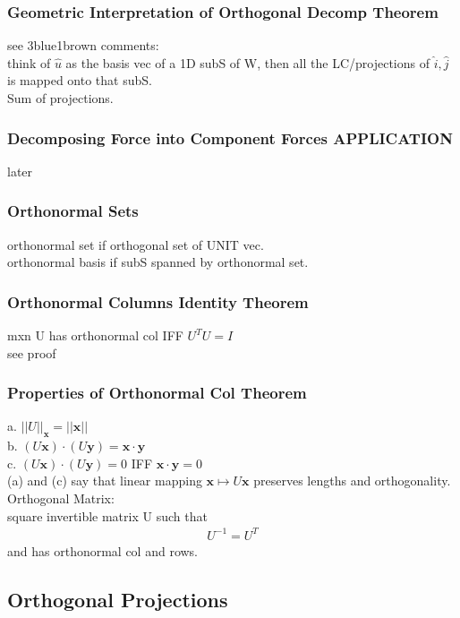 \documentclass[12pt]{article}
\begin{document}
    \subsubsection{Geometric Interpretation of Orthogonal Decomp Theorem}
        see 3blue1brown comments:\\
        think of $\hat{u}$ as the basis vec of a 1D subS of W, then
        all the LC/projections of $\hat{i}, \hat{j}$  is mapped onto
        that subS.\\
        Sum of projections.
    \subsubsection{Decomposing Force into Component Forces APPLICATION}
        later
    \subsubsection{Orthonormal Sets}
        orthonormal set if orthogonal set of UNIT vec. \\
        orthonormal basis if subS spanned by orthonormal set.
    \subsubsection{Orthonormal Columns Identity Theorem}
        mxn U has orthonormal col IFF $U^TU = I$ \\
        see proof
    \subsubsection{Properties of Orthonormal Col Theorem}
        a. $ ||U||_{\bm{x}} = ||\bm{x}|| $  \\
        b. $ (U\bm{x})\cdot (U\bm{y}) = \bm{x}\cdot \bm{y} $ \\
        c. $ (U\bm{x})\cdot (U\bm{y}) = 0 $ IFF  $\bm{x}\cdot \bm{y}= 0$  \\
        (a) and (c) say that linear mapping 
        $\bm{x}\mapsto U\bm{x}$  preserves lengths and orthogonality.\\
        Orthogonal Matrix:\\
        square invertible matrix U such that
        \begin{align*}
            U^{-1}= U^T
        \end{align*}
        and has orthonormal col and rows.
\subsection{Orthogonal Projections}
\end{document}
